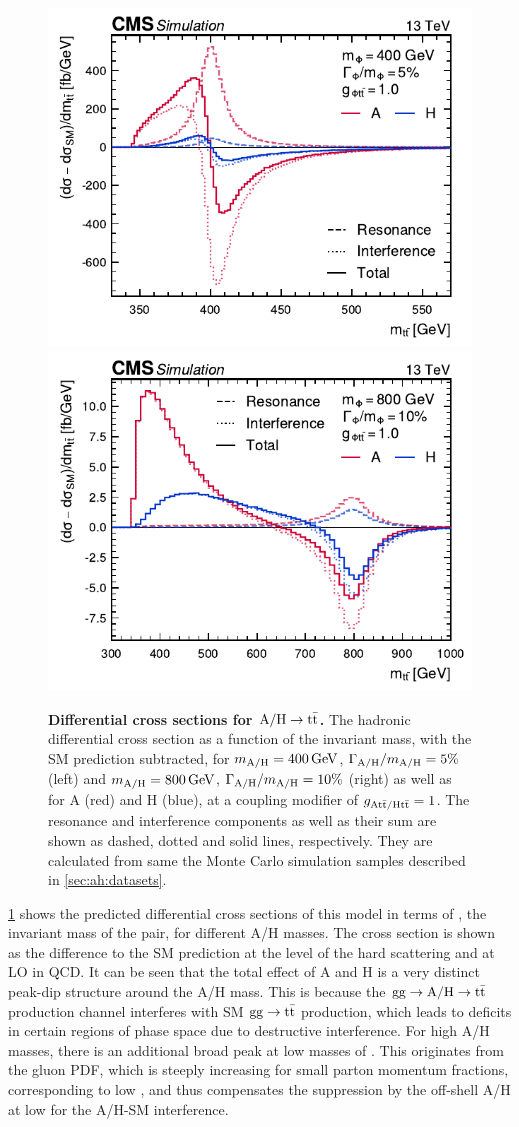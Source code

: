 \begin{figure}[ht!]
    \centering
    \includegraphics[width=0.49\linewidth]{figures/ah/ah_xs/ahspectrum_400.pdf}
    \hfill
    \includegraphics[width=0.49\linewidth]{figures/ah/ah_xs/ahspectrum_800.pdf}
    \caption{\textbf{Differential cross sections for $\mathrm{A/H} \rightarrow \mathrm{t \bar{t}}$.} The hadronic differential cross section as a function of the invariant \ttbar mass, with the SM prediction subtracted, for $m_{\mathrm{A/H}} = \SI{400}{GeV}$, $\Gamma_{\mathrm{A/H}}/m_{\mathrm{A/H}} = 5\%$(left) and $\mAH= \SI{800}{\GeV}$, $\Gamma_{\mathrm{A/H}}/m_{\mathrm{A/H}} = 10\%$ (right) as well as for A (red) and H (blue), at a coupling modifier of $g_{\mathrm{A t \bar{t} / H t \bar{t}}} = 1$. The resonance and interference components as well as their sum are shown as dashed, dotted and solid lines, respectively. They are calculated from same the Monte Carlo simulation samples described in \cref{sec:ah:datasets}.}
    \label{fig:theory:ahxs}
\end{figure}

\cref{fig:theory:ahxs} shows the predicted differential cross sections of this model in terms of \mtt, the invariant mass of the \ttbar pair, for different A/H masses. The cross section is shown as the difference to the SM prediction at the level of the hard scattering and at LO in QCD. It can be seen that the total effect of A and H is a very distinct peak-dip structure around the A/H mass. This is because the $\mathrm{gg \rightarrow A/H \rightarrow \mathrm{t \bar{t}}}$ production channel interferes with SM $\mathrm{gg \rightarrow \mathrm{t \bar{t}}}$ production, which leads to deficits in certain regions of phase space due to destructive interference. For high A/H masses, there is an additional broad peak at low masses of \mtt. This originates from the gluon PDF, which is steeply increasing for small parton momentum fractions, corresponding to low \mtt, and thus compensates the suppression by the off-shell A/H at low \mtt for the A/H-SM interference.

